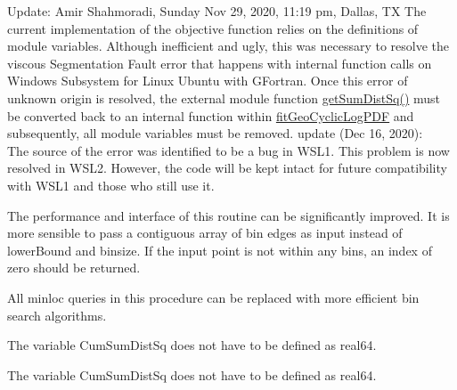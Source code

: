 \begin{DoxyRefList}
%
 Update\+: Amir Shahmoradi, Sunday Nov 29, 2020, 11\+:19 pm, Dallas, TX The current implementation of the objective function relies on the definitions of module variables. Although inefficient and ugly, this was necessary to resolve the viscous Segmentation Fault error that happens with internal function calls on Windows Subsystem for Linux Ubuntu with GFortran. Once this error of unknown origin is resolved, the external module function {\ttfamily \mbox{\hyperlink{namespaceFitGeoCyclic__mod_a2bc7f171d922a5311da63e9ea3ad1603}{get\+Sum\+Dist\+Sq()}}} must be converted back to an internal function within \mbox{\hyperlink{namespaceFitGeoCyclic__mod_a1c31498edcd69664be787f9942aaecea}{fit\+Geo\+Cyclic\+Log\+PDF}} and subsequently, all module variables must be removed. update (Dec 16, 2020)\+: ~\newline
 The source of the error was identified to be a bug in WSL1. This problem is now resolved in WSL2. However, the code will be kept intact for future compatibility with WSL1 and those who still use it. 
\item[Subprogram \mbox{\hyperlink{namespaceHistogram__mod_ad80a9c34cbdd54d1c6b5d652c4def668}{Histogram\+\_\+mod\+::get\+Bin}} (x, lower\+Bound, nbin, binsize)]\label{todo__todo000009}%
%
 The performance and interface of this routine can be significantly improved. It is more sensible to pass a contiguous array of bin edges as input instead of {\ttfamily lower\+Bound} and {\ttfamily binsize}. If the input point is not within any bins, an index of zero should be returned. 
\item[Subprogram \mbox{\hyperlink{namespaceKmeans__mod_ac4b9beeaf1a19b79cfd5aacb8915fb02}{Kmeans\+\_\+mod\+::run\+KPP}} (nc, nd, np, Point, Sum\+Point, Membership, Size, potential)]\label{todo__todo000010}%
%
 All {\ttfamily minloc} queries in this procedure can be replaced with more efficient bin search algorithms.

\label{todo__todo000011}%
%
 The variable {\ttfamily Cum\+Sum\+Dist\+Sq} does not have to be defined as {\ttfamily real64}. 
\item[Subprogram \mbox{\hyperlink{namespaceKmeansOOP__mod_af12decb1817c7b3691239edf3ef79eff}{Kmeans\+OOP\+\_\+mod\+::run\+KPP}} (nc, nd, np, Point, Sum\+Point, Membership, Size, potential)]\label{todo__todo000013}%
%
 The variable {\ttfamily Cum\+Sum\+Dist\+Sq} does not have to be defined as {\ttfamily real64}.


\end{DoxyRefList}

